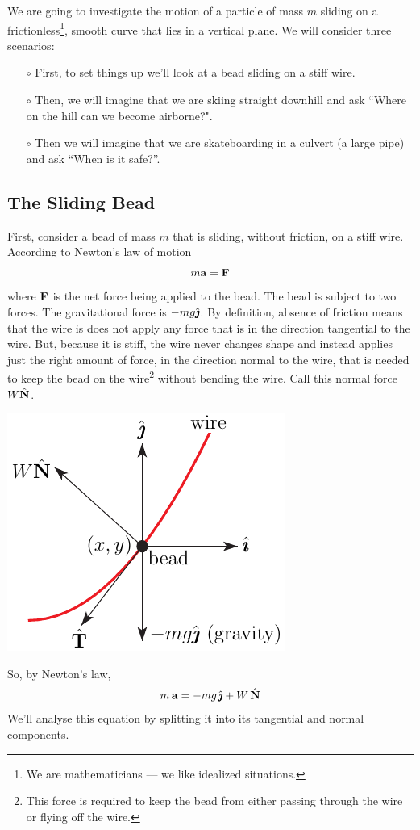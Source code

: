 We are going to investigate the motion of a particle of mass
$m$ sliding on a frictionless\footnote{We are mathematicians --- we like idealized situations.}, smooth curve that lies in a vertical
plane. We will consider three scenarios:
\begin{itemize}\itemsep1pt \parskip0pt  %
\item[$\circ$] 
First, to set things up we'll look at a bead sliding on a stiff wire.
\item[$\circ$] 
Then, we will imagine that we are skiing straight
downhill and ask ``Where on the hill can we become airborne?".
\item[$\circ$] 
Then we will imagine that we are skateboarding in a 
culvert (a large pipe) and ask ``When is it safe?''.
\end{itemize}

\subsection*{The Sliding Bead}
First, consider a bead of mass $m$ that is sliding, without friction, 
on a stiff wire. According to Newton's law of motion
\begin{equation*}
m\mathbf{a} = \mathbf{F}
\end{equation*}
where $\mathbf{F}$ is the net force being applied to the bead. The bead is
subject to two forces. The gravitational force is $-mg\hat{\pmb{\jmath}}$. By
definition, absence of friction means that the wire is does not apply
any force that is in the direction tangential to the wire. But, because
it is stiff, the wire never changes shape and instead applies just the right 
amount of force, in the direction normal to the wire, that is needed 
to keep the bead on the wire\footnote{This force is required to keep 
the bead from either passing through the wire or flying off the wire.} 
without bending the wire. Call this normal force $W\hat{\mathbf{N}}$.
\begin{efig}
\begin{center}
    \includegraphics{wireC.pdf} 
\end{center}
\end{efig}
So, by Newton's law,
\begin{align*}\label{eq:normalComp}
m\,\mathbf{a}=-mg\,\hat{\pmb{\jmath}}+W\,\hat{\mathbf{N}}
\end{align*}
We'll analyse this equation by splitting it into its tangential and
normal components.

